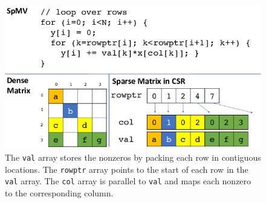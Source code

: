 \begin{figure}[h!]
    \centering
    \includegraphics[width=\linewidth]{figures/Compressed-Sparse-Row-CSR-sparse-matrix-format-The-val-array-stores-the-nonzeros-by.png}
    \caption{The \texttt{val} array stores the nonzeros by packing each row in contiguous locations. The \texttt{rowptr} array points to the start of each row in the \texttt{val} array. The \texttt{col} array is parallel to \texttt{val} and maps each nonzero to the corresponding column.\cite{mohammadi2018sparse}}
    \label{fig:csr}
\end{figure}



